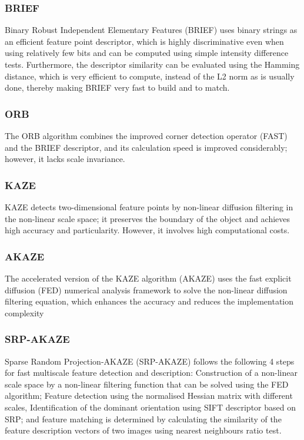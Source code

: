 \documentclass{article}[11pt]
\begin{document}
\subsubsection{BRIEF}
Binary Robust Independent Elementary Features (BRIEF) uses binary strings as an efficient feature point
descriptor, which is highly discriminative
even when using relatively few bits and can be computed using simple
intensity difference tests. Furthermore, the descriptor similarity can be
evaluated using the Hamming distance, which is very efficient to compute, instead of the L2 norm as is usually done, thereby making BRIEF very fast to build and to match.

\subsubsection{ORB}
The ORB algorithm combines the improved corner detection operator (FAST) and the BRIEF descriptor, and its calculation speed is improved considerably; however, it lacks scale invariance.

\subsubsection{KAZE}
KAZE detects two-dimensional feature points by non-linear diffusion filtering in the non-linear scale space; it preserves the boundary of the object and achieves high accuracy and particularity. However, it involves high computational costs.


\subsubsection{AKAZE}
The accelerated version of the KAZE algorithm (AKAZE) uses the fast explicit diffusion (FED) numerical analysis framework to solve the non-linear diffusion filtering equation, which enhances the accuracy and reduces the implementation complexity

\subsubsection{SRP-AKAZE}
Sparse Random Projection-AKAZE (SRP-AKAZE) follows the following 4 steps for fast multiscale feature detection and description: Construction of a non-linear scale space by a non-linear filtering function that can be solved using the FED algorithm; Feature detection using the normalised Hessian matrix with different scales, Identification of the dominant orientation using SIFT descriptor based on SRP; and feature matching is determined by calculating the similarity of the feature description vectors of two images using nearest neighbours ratio test.
\end{document}
